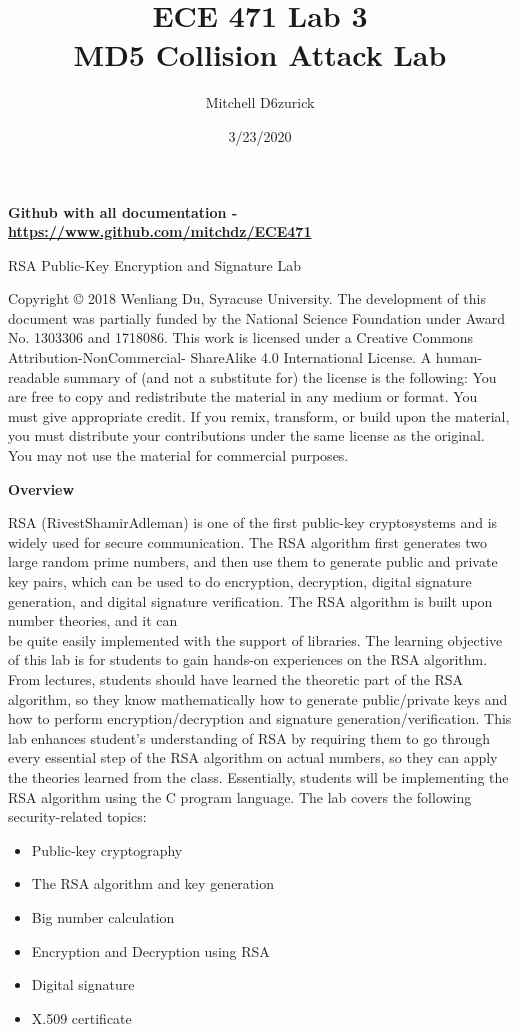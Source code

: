 \documentclass[12pt]{article}
\title {{\bf ECE 471 Lab 3} \\
\large{MD5 Collision Attack Lab}}
\author{Mitchell D6zurick}
\date{3/23/2020}
\newcommand\tab[1][0.5cm]{\hspace*{#1}}
\begin{document}
\maketitle
\textbf{Github with all documentation - \url{https://www.github.com/mitchdz/ECE471}}
\tableofcontents 

\clearpage


RSA Public-Key Encryption and Signature Lab

Copyright © 2018 Wenliang Du, Syracuse University. The development of this document was partially funded by the National
Science Foundation under Award No. 1303306 and 1718086. This work is licensed under a Creative Commons
Attribution-NonCommercial- ShareAlike 4.0 International License. A human-readable summary of (and not a substitute for)
the license is the following: You are free to copy and redistribute the material in any medium or format. You must give
appropriate credit. If you remix, transform, or build upon the material, you must distribute your contributions under the
same license as the original. You may not use the material for commercial purposes.

\textbf{Overview}

RSA (RivestShamirAdleman) is one of the first public-key cryptosystems and is widely used for secure
communication. The RSA algorithm first generates two large random prime numbers, and then use them
to generate public and private key pairs, which can be used to do encryption, decryption, digital signature
generation, and digital signature verification. The RSA algorithm is built upon number theories, and it can
\\
\tab be quite easily implemented with the support of libraries.
The learning objective of this lab is for students to gain hands-on experiences on the RSA algorithm.
From lectures, students should have learned the theoretic part of the RSA algorithm, so they know mathematically how to generate public/private keys and how to perform encryption/decryption and signature
generation/verification. This lab enhances student’s understanding of RSA by requiring them to go through
every essential step of the RSA algorithm on actual numbers, so they can apply the theories learned from
the class. Essentially, students will be implementing the RSA algorithm using the C program language. The
lab covers the following security-related topics:

    \begin{itemize}
        \item Public-key cryptography
        \item The RSA algorithm and key generation
        \item Big number calculation
        \item Encryption and Decryption using RSA
        \item Digital signature
        \item X.509 certificate
    \end{itemize}
\end{document}
